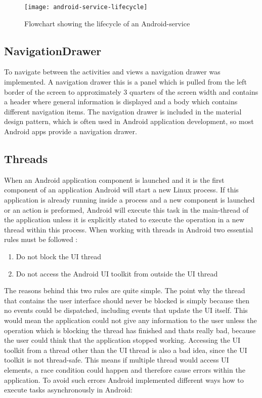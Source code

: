 \begin{figure}[H]
    \centering
    \texttt{[image: android-service-lifecycle]}
    \caption{Flowchart showing the lifecycle of an Android-service}
    \label{fig:servicelifecycle}
\end{figure}

\subsection{NavigationDrawer}
To navigate between the activities and views a navigation drawer was implemented. A navigation drawer this is a panel which is pulled from the left border of the screen to approximately 3 quarters of the screen width and contains a header where general information is displayed and a body which contains different navigation items. The navigation drawer is included in the material design pattern, which is often used in Android application development, so most Android apps provide a navigation drawer.

\subsection{Threads}
When an Android application component is launched and it is the first component of an application Android will start a new Linux process. If this application is already running inside a process and a new component is launched or an action is preformed, Android will execute this task in the main-thread of the application unless it is explicitly stated to execute the operation in a new thread within this process. When working with threads in Android two essential rules must be followed \autocite{AndroidThreads} :

\begin{enumerate}
    \item Do not block the UI thread
    \item Do not access the Android UI toolkit from outside the UI thread
\end{enumerate}

\noindent The reasons behind this two rules are quite simple. The point why the thread that contains the user interface should never be blocked is simply because then no events could be dispatched, including events that update the UI itself. This would mean the application could not give any information to the user unless the operation which is blocking the thread has finished and thats really bad, because the user could think that the application stopped working. Accessing the UI toolkit from a thread other than the UI thread is also a bad idea, since the UI toolkit is not thread-safe. This means if multiple thread would access UI elements, a race condition could happen and therefore cause errors within the application. To avoid such errors Android implemented different ways how to execute tasks asynchronously in Android:

